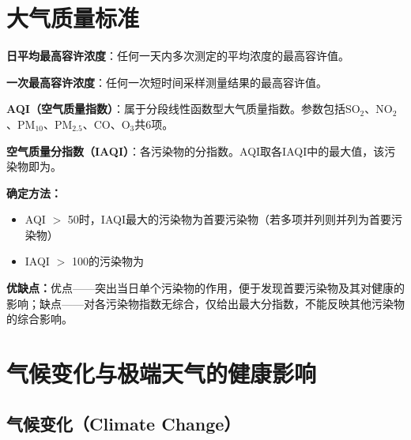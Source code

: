 \documentclass[10pt,a4paper,oneside]{ctexbook}
\begin{document}
\section{大气质量标准}

\begin{defbox}
\textbf{日平均最高容许浓度}：任何一天内多次测定的平均浓度的最高容许值。

\textbf{一次最高容许浓度}：任何一次短时间采样测量结果的最高容许值。
\end{defbox}

\begin{tipbox}
\textbf{AQI（空气质量指数）}：属于分段线性函数型大气质量指数。参数包括SO$_2$、NO$_2$、PM$_{10}$、PM$_{2.5}$、CO、O$_3$共6项。

\textbf{空气质量分指数（IAQI）}：各污染物的分指数。AQI取各IAQI中的最大值，该污染物即为。

\textbf{确定方法：}
\begin{itemize}[leftmargin=*]
    \item AQI $>$ 50时，IAQI最大的污染物为首要污染物（若多项并列则并列为首要污染物）
    \item IAQI $>$ 100的污染物为
\end{itemize}

\textbf{优缺点：}优点——突出当日单个污染物的作用，便于发现首要污染物及其对健康的影响；缺点——对各污染物指数无综合，仅给出最大分指数，不能反映其他污染物的综合影响。
\end{tipbox}

\section{气候变化与极端天气的健康影响}

\subsection{气候变化（Climate Change）}
\end{document}
